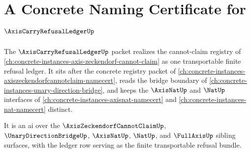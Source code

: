 \chapter{A Concrete Naming Certificate for $\AxisCarryRefusalLedgerUp$}
\label{ch:concrete-instances-axis-carry-refusal-ledger-namecert}

The $\AxisCarryRefusalLedgerUp$ packet realizes the cannot-claim registry of \autoref{ch:concrete-instances-axis-zeckendorf-cannot-claim} as one transportable finite refusal ledger. It sits after the concrete registry packet of \autoref{ch:concrete-instances-axiszeckendorfcannotclaim-namecert}, reads the bridge boundary of \autoref{ch:concrete-instances-unary-direction-bridge}, and keeps the $\AxisNatUp$ and $\NatUp$ interfaces of \autoref{ch:concrete-instances-axisnat-namecert} and \autoref{ch:concrete-instances-nat-namecert} distinct.

It is an ai over the $\AxisZeckendorfCannotClaimUp$, $\UnaryDirectionBridgeUp$, $\AxisNatUp$, $\NatUp$, and $\FullAxisUp$ sibling surfaces, with the ledger row serving as the finite transportable refusal bundle.



